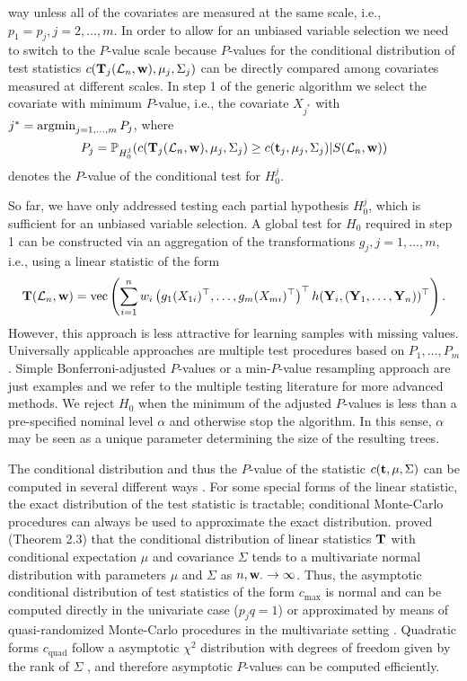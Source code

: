 way unless all of the covariates are measured at the same scale, i.e.,
$p_1 = p_j, j = 2, \dots, m$. 
In order to allow for an unbiased variable selection we need to switch to
the $P$-value scale because $P$-values for the conditional distribution of test
statistics $c(\mathbf{T}_j(\mathcal{L}_n, \mathbf{w}), \mu_j, \Sigma_j)$ 
can be directly compared among covariates
measured at different scales. In step 1 of the generic algorithm we 
select the covariate with minimum $P$-value, i.e., the covariate $X_{j^*}$
with $j^*  =  \operatorname{argmin}\displaylimits_{j = 1, \dots, m} P_j$, where
\begin{displaymath}
P_j  =  \mathbb{P}_{H_0^j}(c(\mathbf{T}_j(\mathcal{L}_n, \mathbf{w}), \mu_j,
            \Sigma_j) \ge c(\mathbf{t}_j, \mu_j, \Sigma_j) | S(\mathcal{L}_n, \mathbf{w}))
\end{displaymath}
denotes the $P$-value of the conditional test for $H_0^j$. 

So far, we have only addressed testing each partial hypothesis $H_0^j$, which
is sufficient for an unbiased variable selection. A global test 
for $H_0$ required in step 1 can be constructed via an aggregation of the 
transformations $g_j, j = 1, \dots, m$,
i.e., using a linear statistic of the form
\begin{eqnarray*}
\mathbf{T}(\mathcal{L}_n, \mathbf{w}) = \text{vec} \left( \sum_{i=1}^n w_i
\left(g_1(X_{1i})^\top, \dots,
g_m(X_{mi})^\top\right)^\top h(\mathbf{Y}_i, (\mathbf{Y}_1, \dots, \mathbf{Y}_n))^\top \right).
\end{eqnarray*}
However, this approach is less attractive for learning samples with
missing values. Universally applicable approaches are multiple test 
procedures based on $P_1, \dots, P_m$. 
Simple Bonferroni-adjusted $P$-values or a min-$P$-value resampling approach are just examples and we refer
to the multiple testing literature \citep[e.g.,][]{WestfallYoung1993}
for more advanced methods. We reject $H_0$ when the minimum 
of the adjusted $P$-values is less than a pre-specified nominal level $\alpha$
and otherwise stop the algorithm. In this sense, $\alpha$
may be seen as a unique parameter determining the size of the resulting trees.

The conditional distribution and thus the $P$-value 
of the statistic $c(\mathbf{t}, \mu, \Sigma)$ can be
computed in several different ways \citep[see][for an overview]{Z-papers:Hothorn+Hornik+VanDeWiel:2006}.
For some special forms of the
linear statistic, the exact distribution of the test statistic is tractable;
conditional Monte-Carlo procedures can always be used to approximate the exact
distribution. \cite{StrasserWeber1999} proved (Theorem 2.3) that the
conditional distribution of linear statistics $\mathbf{T}$ with conditional
expectation $\mu$ and covariance $\Sigma$ tends to a multivariate normal
distribution with parameters $\mu$ and $\Sigma$ as $n, \mathbf{w}_\cdot \rightarrow
\infty$. Thus, the asymptotic conditional distribution of test statistics of the
form $c_\text{max}$ is normal and
can be computed directly in the univariate case ($p_jq = 1$)
or approximated by means of quasi-randomized Monte-Carlo 
procedures in the multivariate setting \citep{numerical-:1992}. Quadratic forms
$c_\text{quad}$ follow a asymptotic 
$\chi^2$ distribution with degrees of freedom 
given by the rank of $\Sigma$ \citep[Theorem 6.20, ][]{Rasch1995},
and therefore asymptotic $P$-values can be computed efficiently.

